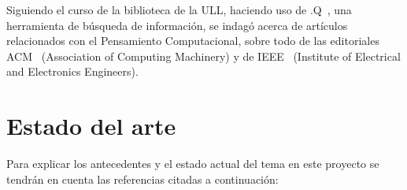 
Siguiendo el curso de la biblioteca de la ULL, haciendo uso de .Q~\cite{PuntoQ}, una herramienta de búsqueda de información, se indagó acerca de artículos relacionados con el Pensamiento Computacional, sobre todo de las editoriales ACM~\cite{ACM} (Association of Computing Machinery) y 
de IEEE~\cite{IEEE} (Institute of Electrical and Electronics Engineers).


\section{Estado del arte}
\label{2:sec:1}

Para explicar los antecedentes y el estado actual del tema en este proyecto se tendrán en cuenta las referencias citadas a continuación:

